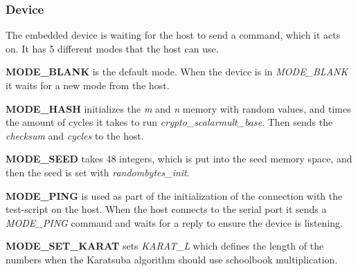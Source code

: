 \subsubsection{Device}
The embedded device is waiting for the host to send a command, which it acts on. It has 5 different modes that the host can use.

\medskip
\textbf{MODE\_BLANK} is the default mode. When the device is in \textit{MODE\_BLANK} it waits for a new mode from the host.

\medskip
\textbf{MODE\_HASH} initializes the \textit{m} and \textit{n} memory with random values, and times the amount of cycles it takes to run \textit{crypto\_scalarmult\_base}. Then sends the \textit{checksum} and \textit{cycles} to the host.

\medskip
\textbf{MODE\_SEED} takes 48 integers, which is put into the seed memory space, and then the seed is set with \textit{randombytes\_init}.

\medskip
\textbf{MODE\_PING} is used as part of the initialization of the connection with the test-script on the host. When the host connects to the serial port it sends a \textit{MODE\_PING} command and waits for a reply to ensure the device is listening.

\medskip
\textbf{MODE\_SET\_KARAT} sets \textit{KARAT\_L} which defines the length of the numbers when the Karatsuba algorithm should use schoolbook multiplication.

\medskip
